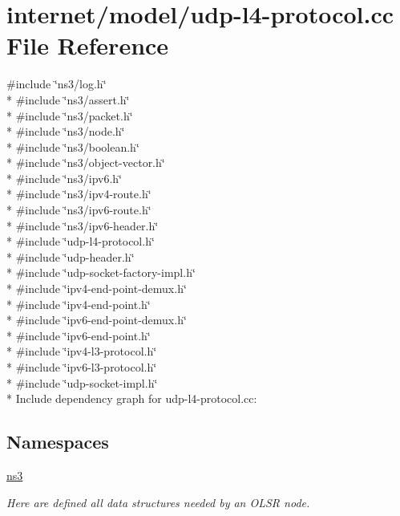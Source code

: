 \hypertarget{udp-l4-protocol_8cc}{}\section{internet/model/udp-\/l4-\/protocol.cc File Reference}
\label{udp-l4-protocol_8cc}
{\ttfamily \#include \char`\"{}ns3/log.\+h\char`\"{}}\\*
{\ttfamily \#include \char`\"{}ns3/assert.\+h\char`\"{}}\\*
{\ttfamily \#include \char`\"{}ns3/packet.\+h\char`\"{}}\\*
{\ttfamily \#include \char`\"{}ns3/node.\+h\char`\"{}}\\*
{\ttfamily \#include \char`\"{}ns3/boolean.\+h\char`\"{}}\\*
{\ttfamily \#include \char`\"{}ns3/object-\/vector.\+h\char`\"{}}\\*
{\ttfamily \#include \char`\"{}ns3/ipv6.\+h\char`\"{}}\\*
{\ttfamily \#include \char`\"{}ns3/ipv4-\/route.\+h\char`\"{}}\\*
{\ttfamily \#include \char`\"{}ns3/ipv6-\/route.\+h\char`\"{}}\\*
{\ttfamily \#include \char`\"{}ns3/ipv6-\/header.\+h\char`\"{}}\\*
{\ttfamily \#include \char`\"{}udp-\/l4-\/protocol.\+h\char`\"{}}\\*
{\ttfamily \#include \char`\"{}udp-\/header.\+h\char`\"{}}\\*
{\ttfamily \#include \char`\"{}udp-\/socket-\/factory-\/impl.\+h\char`\"{}}\\*
{\ttfamily \#include \char`\"{}ipv4-\/end-\/point-\/demux.\+h\char`\"{}}\\*
{\ttfamily \#include \char`\"{}ipv4-\/end-\/point.\+h\char`\"{}}\\*
{\ttfamily \#include \char`\"{}ipv6-\/end-\/point-\/demux.\+h\char`\"{}}\\*
{\ttfamily \#include \char`\"{}ipv6-\/end-\/point.\+h\char`\"{}}\\*
{\ttfamily \#include \char`\"{}ipv4-\/l3-\/protocol.\+h\char`\"{}}\\*
{\ttfamily \#include \char`\"{}ipv6-\/l3-\/protocol.\+h\char`\"{}}\\*
{\ttfamily \#include \char`\"{}udp-\/socket-\/impl.\+h\char`\"{}}\\*
Include dependency graph for udp-\/l4-\/protocol.cc\+:
\subsection*{Namespaces}
\begin{DoxyCompactItemize}
\item 
 \hyperlink{namespacens3}{ns3}
\begin{DoxyCompactList}\small\item\em Here are defined all data structures needed by an O\+L\+SR node. \end{DoxyCompactList}\end{DoxyCompactItemize}
